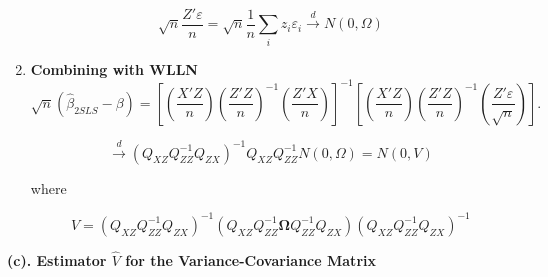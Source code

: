 \documentclass[12pt, oneside]{article}
\begin{document}
\begin{enumerate}
\[
\sqrt{n} \frac{Z'\varepsilon}{n} = \sqrt{n} \frac{1}{n} \sum_i z_i \varepsilon_i \xrightarrow{d} N(0, \Omega)
\]

\item \textbf{Combining with WLLN}
\[
\sqrt{n}(\hat{\beta}_{2SLS} - \beta) = \left[ \left(\frac{X'Z}{n}\right) \left(\frac{Z'Z}{n}\right)^{-1} \left(\frac{Z'X}{n}\right) \right]^{-1} 
\left[ \left(\frac{X'Z}{n}\right) \left(\frac{Z'Z}{n}\right)^{-1} \left(\frac{Z'\varepsilon}{\sqrt{n}}\right) \right].
\]

\[
\xrightarrow{d} (Q_{XZ} Q_{ZZ}^{-1} Q_{ZX})^{-1} Q_{XZ} Q_{ZZ}^{-1} N(0, \Omega) = N(0, V)
\]

where 

\[
V = (Q_{XZ} Q_{ZZ}^{-1} Q_{ZX})^{-1} (Q_{XZ} Q_{ZZ}^{-1} \boldsymbol{\Omega} Q_{ZZ}^{-1} Q_{ZX}) (Q_{XZ} Q_{ZZ}^{-1} Q_{ZX})^{-1}
\]
\end{enumerate}

\textbf{(c). Estimator \( \hat{V} \) for the Variance-Covariance Matrix}
\end{document}
